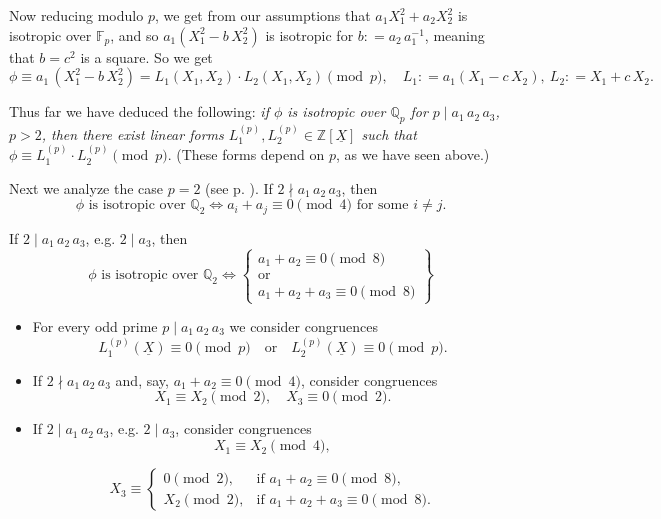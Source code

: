\documentclass{article}
\newcommand{\dfn}{\mathrel{\mathop:}=}
\newcommand{\ZZ}{\mathbb{Z}}
\newcommand{\FF}{\mathbb{F}}
\newcommand{\QQ}{\mathbb{Q}}
\theoremstyle{myplain}
\theoremstyle{mydefinition}
\begin{document}
Now reducing modulo $p$, we get from our assumptions that
$a_1 X_1^2 + a_2 X_2^2$ is isotropic over $\FF_p$, and so
$a_1 (X_1^2 - b\,X_2^2)$ is isotropic for $b \dfn a_2\,a_1^{-1}$, meaning that
$b = c^2$ is a square. So we get
\[ \phi \equiv a_1 \, (X_1^2 - b\,X_2^2) = L_1 (X_1,X_2)\cdot L_2 (X_1,X_2) \pmod{p}, \quad
  L_1 \dfn a_1 (X_1 - c\,X_2), ~ L_2 \dfn X_1 + c\,X_2. \]

Thus far we have deduced the following:
\emph{if $\phi$ is isotropic over $\QQ_p$ for $p \mid a_1\,a_2\,a_3$, $p > 2$,
  then there exist linear forms $L_1^{(p)}, L_2^{(p)} \in \ZZ [\underline{X}]$
  such that $\phi \equiv L_1^{(p)}\cdot L_2^{(p)} \pmod{p}$}.
(These forms depend on $p$, as we have seen above.)

\vspace{1em}

Next we analyze the case $p = 2$ (see p. \pageref{isotropic-over-Q2}). If
$2 \nmid a_1\,a_2\,a_3$, then
\[ \phi \text{ is isotropic over }\QQ_2 \iff a_i + a_j \equiv 0 \pmod{4} \text{ for some }i \ne j. \]

If $2 \mid a_1\,a_2\,a_3$, e.g. $2 \mid a_3$, then
\[ \phi \text{ is isotropic over }\QQ_2 \iff \left\{\begin{array}{c}
                                                      a_1 + a_2 \equiv 0 \pmod{8} \\
                                                      \text{or} \\
                                                      a_1 + a_2 + a_3 \equiv 0 \pmod{8}
                                                    \end{array}\right\} \]

\vspace{1em}

\begin{itemize}
\item For every odd prime $p \mid a_1\,a_2\,a_3$ we consider congruences
  \[ L_1^{(p)} (\underline{X}) \equiv 0 \pmod{p} \quad
    \text{or} \quad
    L_2^{(p)} (\underline{X}) \equiv 0 \pmod{p}. \]

\item If $2 \nmid a_1\,a_2\,a_3$ and, say, $a_1 + a_2 \equiv 0 \pmod{4}$,
  consider congruences
  \[ X_1 \equiv X_2 \pmod{2}, \quad X_3 \equiv 0 \pmod{2}. \]

\item If $2 \mid a_1\,a_2\,a_3$, e.g. $2 \mid a_3$, consider congruences
  \[ X_1 \equiv X_2 \pmod{4}, \]

  \[ X_3 \equiv
    \left\{\begin{array}{ll}
             0 \pmod{2}, & \text{if } a_1 + a_2 \equiv 0 \pmod{8},\\
             X_2 \pmod{2}, & \text{if } a_1 + a_2 + a_3 \equiv 0 \pmod{8}.
           \end{array}\right. \]
\end{itemize}
\end{document}
